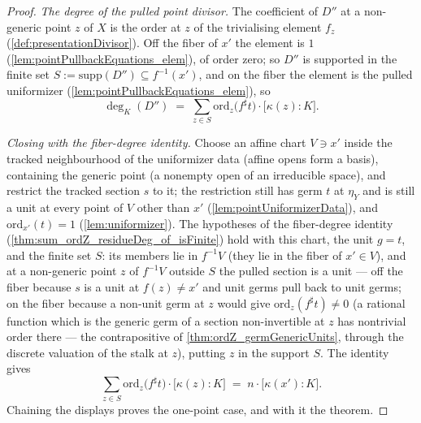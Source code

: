 \begin{proof}
  \emph{The degree of the pulled point divisor.} The coefficient of \(D''\) at a
  non-generic point \(z\) of \(X\) is the order at \(z\) of the trivialising element
  \(f_z\) (\ref{def:presentationDivisor}). Off the fiber of \(x'\) the element is
  \(1\) (\ref{lem:pointPullbackEquations_elem}), of order zero; so \(D''\) is
  supported in the finite set \(S := \mathrm{supp}(D'') \subseteq f^{-1}(x')\), and on
  the fiber the element is the pulled uniformizer
  (\ref{lem:pointPullbackEquations_elem}), so
  \[
    \deg_{K}(D'') \;=\; \sum_{z \in S}
      \mathrm{ord}_z\bigl(f^{\sharp}t\bigr) \cdot \bigl[\kappa(z) : K\bigr].
  \]

  \emph{Closing with the fiber-degree identity.} Choose an affine chart
  \(V \ni x'\) inside the tracked neighbourhood of the uniformizer data (affine opens
  form a basis), containing the generic point (a nonempty open of an irreducible
  space), and restrict the tracked section \(s\) to it; the restriction still has germ
  \(t\) at \(\eta_Y\) and is still a unit at every point of \(V\) other than \(x'\)
  (\ref{lem:pointUniformizerData}), and \(\mathrm{ord}_{x'}(t) = 1\)
  (\ref{lem:uniformizer}). The hypotheses of the fiber-degree identity
  (\ref{thm:sum_ordZ_residueDeg_of_isFinite}) hold with this chart, the unit
  \(g = t\), and the finite set \(S\): its members lie in \(f^{-1}V\) (they lie in the
  fiber of \(x' \in V\)), and at a non-generic point \(z\) of \(f^{-1}V\) outside
  \(S\) the pulled section is a unit --- off the fiber because \(s\) is a unit at
  \(f(z) \neq x'\) and unit germs pull back to unit germs; on the fiber because a
  non-unit germ at \(z\) would give \(\mathrm{ord}_z(f^{\sharp}t) \neq 0\) (a rational
  function which is the generic germ of a section non-invertible at \(z\) has
  nontrivial order there --- the contrapositive of \ref{thm:ordZ_germGenericUnits},
  through the discrete valuation of the stalk at \(z\)), putting \(z\) in the support
  \(S\). The identity gives
  \[
    \sum_{z \in S} \mathrm{ord}_z\bigl(f^{\sharp}t\bigr) \cdot
      \bigl[\kappa(z) : K\bigr]
    \;=\; n \cdot \bigl[\kappa(x') : K\bigr].
  \]
  Chaining the displays proves the one-point case, and with it the theorem.
\end{proof}

